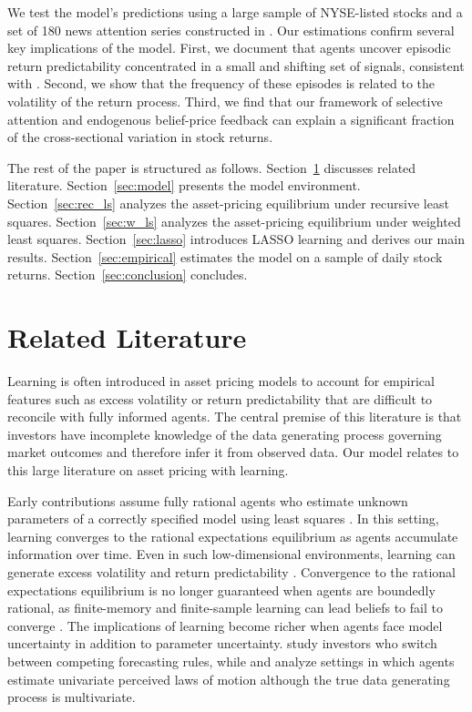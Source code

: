 \documentclass[11pt]{article}
\begin{document}
We test the model's predictions using a large sample of NYSE-listed stocks and a set of 180 news attention series constructed in \citet{Bybee2021}.
Our estimations confirm several key implications of the model.
First, we document that agents uncover episodic return predictability concentrated in a small and shifting set of signals, consistent with \citet{Chinco2019}.
Second, we show that the frequency of these episodes is related to the volatility of the return process.
Third, we find that our framework of selective attention and endogenous belief-price feedback can explain a significant fraction of the cross-sectional variation in stock returns.

The rest of the paper is structured as follows.
Section~\ref{sec:literature} discusses related literature.
Section~\ref{sec:model} presents the model environment.
Section~\ref{sec:rec_ls} analyzes the asset-pricing equilibrium under recursive least squares.
Section~\ref{sec:w_ls} analyzes the asset-pricing equilibrium under weighted least squares.
Section~\ref{sec:lasso} introduces LASSO learning and derives our main results.
Section~\ref{sec:empirical} estimates the model on a sample of daily stock returns.
Section~\ref{sec:conclusion} concludes.

\section{Related Literature}\label{sec:literature}

Learning is often introduced in asset pricing models to account for empirical features such as excess volatility or return predictability that are difficult to reconcile with fully informed agents.
The central premise of this literature is that investors have incomplete knowledge of the data generating process governing market outcomes and therefore infer it from observed data.
Our model relates to this large literature on asset pricing with learning. 

Early contributions assume fully rational agents who estimate unknown parameters of a correctly specified model using least squares \citep{Marcet1989}. 
In this setting, learning converges to the rational expectations equilibrium as agents accumulate information over time. 
Even in such low-dimensional environments, learning can generate excess volatility and return predictability \citep{Timmermann1993,Timmermann1996}. 
Convergence to the rational expectations equilibrium is no longer guaranteed when agents are boundedly rational, as finite-memory and finite-sample learning can lead beliefs to fail to converge \citep{Honkapohja2003}. 
The implications of learning become richer when agents face model uncertainty in addition to parameter uncertainty. 
\citet{barberis1998model} study investors who switch between competing forecasting rules, while \citet{hong2007simple} and \citet{Branch2010} analyze settings in which agents estimate univariate perceived laws of motion although the true data generating process is multivariate.
\end{document}
